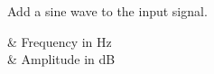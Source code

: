 Add a sine wave to the input signal.

\begin{tscattributes}
 & Frequency in Hz\\
 & Amplitude in dB\\
\end{tscattributes}

